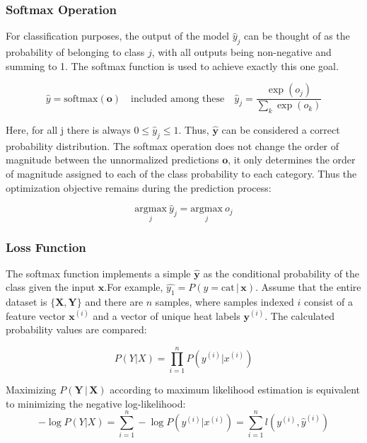 \documentclass[a4paper,12pt]{article}
\begin{document}
\subsubsection{Softmax Operation}
For classification purposes, the output of the model $\hat{y}_j$ can be thought of as the probability of belonging to class $j$, with all outputs being
non-negative and summing to 1. The softmax function is used to achieve exactly this one goal.

\begin{equation}
\hat{y} = \text{softmax}(\mathbf{o}) \quad \text{included among these} \quad \hat{y}_j = \frac{\exp(o_j)}{\sum_k \exp(o_k)}
\end{equation}

Here, for all j there is always $0 \leq \hat{y}_j \leq 1$. Thus, $\hat{\mathbf{y}}$ can be considered a correct probability distribution.
The softmax operation does not change the order of magnitude between the unnormalized predictions $\mathbf{o}$, it only determines the order of magnitude assigned to each of the class
probability to each category. Thus the optimization objective remains during the prediction process:

\begin{equation}
\underset{j}{\mathrm{argmax}} \ \hat{y}_j = \underset{j}{\mathrm{argmax}} \ o_j
\end{equation}

\subsubsection{Loss Function}
The softmax function implements a simple \(\hat{\mathbf{y}}\) as the conditional probability of the class given the input \(\mathbf{x}\).For example, \(\hat{y_1} = P(y = \text{cat} \, | \, \mathbf{x})\). Assume that the entire dataset is \(\{\mathbf{X}, \mathbf{Y}\}\) and there are \(n\) samples, where samples indexed \(i\) consist of a feature vector \(\mathbf{x}^{(i)}\) and a vector of unique heat labels \(\mathbf{y}^{(i)}\). The calculated probability values are compared:

\begin{equation}
P(Y | X) = \prod_{i=1}^{n} P(y^{(i)} | x^{(i)})
\end{equation}

Maximizing $P(\mathbf{Y} \,| \, \mathbf{X})$ according to maximum likelihood estimation is equivalent to minimizing the negative log-likelihood:
\begin{equation}
-\log P(Y | X) = \sum_{i=1}^{n} -\log P(y^{(i)} | x^{(i)}) = \sum_{i=1}^{n} l(y^{(i)}, \hat{y}^{(i)})
\end{equation}
\end{document}
